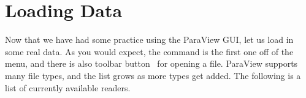 \section{Loading Data}

Now that we have had some practice using the ParaView GUI, let us load in
some real data.  As you would expect, the  command is the first
one off of the  menu, and there is also toolbar
button~ for opening a file.  ParaView supports many file
types, and the list grows as more types get added.  The following is a list
of currently available readers.

